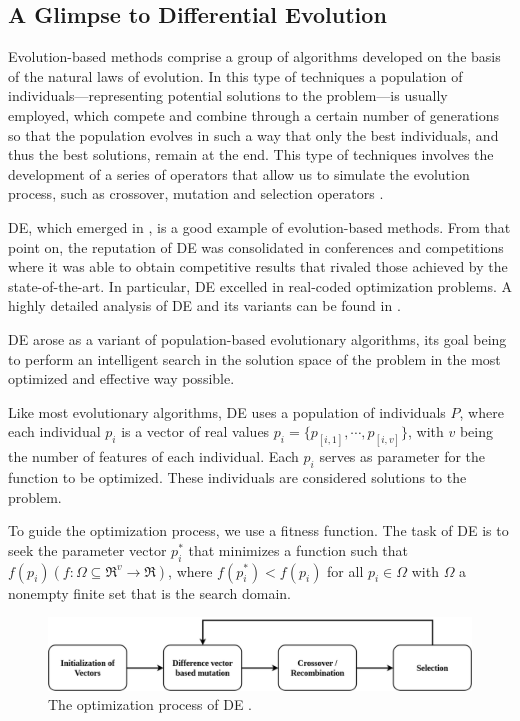 \subsection{A Glimpse to Differential Evolution}

Evolution-based methods comprise a group of algorithms developed on the basis of the natural laws of evolution. In this type of techniques a population of individuals---representing potential solutions to the problem---is usually employed, which compete and combine through a certain number of generations so that the population evolves in such a way that only the best individuals, and thus the best solutions, remain at the end. This type of techniques involves the development of a series of operators that allow us to simulate the evolution process, such as crossover, mutation and selection operators \cite{fausto2019ants}. 

\acf{DE}, which emerged in \cite{storn1997differential}, is a good example of evolution-based methods. From that point on, the reputation of \acs{DE} was consolidated in conferences and competitions where it was able to obtain competitive results that rivaled those achieved by the state-of-the-art. In particular, \acs{DE} excelled in real-coded optimization problems. A highly detailed analysis of \acs{DE} and its variants can be found in \cite{das2011differential}.

\acs{DE} arose as a variant of population-based evolutionary algorithms, its goal being to perform an intelligent search in the solution space of the problem in the most optimized and effective way possible.

Like most evolutionary algorithms, \acs{DE} uses a population of individuals $P$, where each individual $p_i$ is a vector of real values $p_i = \{p_{[i,1]},\cdots,p_{[i,v]}\}$, with $v$ being the number of features of each individual. Each $p_i$ serves as parameter for the function to be optimized. These individuals are considered solutions to the problem.

To guide the optimization process, we use a fitness function. The task of \acs{DE} is to seek the parameter vector $p_i^*$ that minimizes a function such that $f(p_i)(f: \Omega \subseteq \mathfrak{R}^{v} \rightarrow \mathfrak{R})$, where $f(p_i^*) < f(p_i)$ for all $p_i \in \Omega$ with $\Omega$ a nonempty finite set that is the search domain.

\begin{figure}[!h]
	\centering
	\includegraphics[scale=0.3]{gfx/NewProp/SHADE/DEop.png}
	\caption[The optimization process of DE.]{The optimization process of \acs{DE} \cite{das2011differential}.}\label{fig:DE}
\end{figure}

